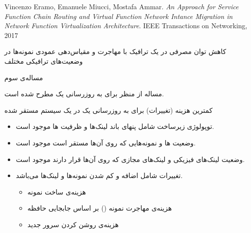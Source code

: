 \documentclass{beamer}
\makeatletter
\newcommand{\RTList}{\raggedleft\rightskip\@totalleftmargin}
\makeatother
\begin{document}
\begin{persian}
\begin{frame}
	\begin{latin}\begin{thebibliography}{9}
		Vincenzo Eramo, Emanuele Miucci, Mostafa Ammar.
		\textit{An Approach for Service Function Chain Routing and Virtual Function Network Intance Migration in Network Function Virtualization Architecture}. 
		IEEE Transactions on Networking, 2017
	\end{thebibliography}\end{latin}
	\par
	کاهش توان مصرفی در یک ترافیک 
	با مهاجرت و مقیاس‌دهی عمودی نمونه‌ها در وضعیت‌های ترافیکی مختلف
\end{frame}
\begin{frame}{مساله‌ی سوم}
	\par
	مساله از منظر  برای به روزرسانی یک 
	مطرح شده است.
\end{frame}
\begin{frame}
	\par
	کمترین هزینه (تغییرات) برای به روزرسانی یک 
	در یک سیستم مستقر شده
\end{frame}
\begin{frame}
	\begin{itemize}\RTList
		\item توپولوژی زیرساخت شامل پنهای باند لینک‌ها و ظرفیت ها موجود است.
		\item وضعیت ها و نمونه‌هایی که روی آن‌ها مستقر است موجود است.
		\item وضعیت لینک‌های فیزیکی و لینک‌های مجازی که روی آن‌ها قرار دارند موجود است.
		\item تغییرات شامل اضافه و کم شدن نمونه‌ها و لینک‌ها می‌باشد.
		\begin{itemize}\RTList
			\item هزینه‌ی ساخت نمونه
			\item هزینه‌ی مهاجرت نمونه () بر اساس جابجایی حافظه
			\item هزینه‌ی روشن کردن سرور جدید
		\end{itemize}
	\end{itemize}
\end{frame}
\end{persian}
\end{document}
